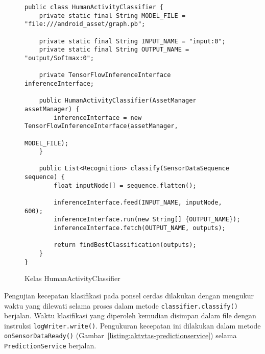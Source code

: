 \begin{figure}[h!]
\begin{verbatim}
public class HumanActivityClassifier {
    private static final String MODEL_FILE = "file:///android_asset/graph.pb";

    private static final String INPUT_NAME = "input:0";
    private static final String OUTPUT_NAME = "output/Softmax:0";

    private TensorFlowInferenceInterface inferenceInterface;

    public HumanActivityClassifier(AssetManager assetManager) {
        inferenceInterface = new TensorFlowInferenceInterface(assetManager,
                                                              MODEL_FILE);
    }

    public List<Recognition> classify(SensorDataSequence sequence) {
        float inputNode[] = sequence.flatten();

        inferenceInterface.feed(INPUT_NAME, inputNode, 600);
        inferenceInterface.run(new String[] {OUTPUT_NAME});
        inferenceInterface.fetch(OUTPUT_NAME, outputs);

        return findBestClassification(outputs);
    }
}
\end{verbatim}
\caption{Kelas HumanActivityClassifier}
\label{listing:aktvtas-humanactivityclassifier}
\end{figure}

Pengujian kecepatan klasifikasi pada ponsel cerdas dilakukan dengan mengukur waktu yang dilewati selama proses dalam metode \texttt{classifier.classify()} berjalan. Waktu klasifikasi yang diperoleh kemudian disimpan dalam file dengan instruksi \texttt{logWriter.write()}. Pengukuran kecepatan ini dilakukan dalam metode \texttt{onSensorDataReady()} (Gambar~\ref{listing:aktvtas-predictionservice}) selama \texttt{PredictionService} berjalan.


